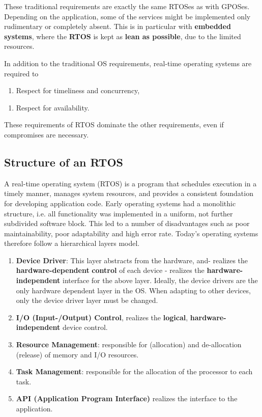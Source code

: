 These traditional requirements are exactly the same RTOSes as with GPOSes. Depending on the application, some of the services might be implemented only  rudimentary or completely absent. This is in particular with \textbf{embedded} \textbf{systems}, where the \textbf{RTOS} is kept as \textbf{lean as possible}, due to the limited resources.

In addition to the traditional OS requirements, real-time operating systems are required to 

\begin{enumerate}
	\item  Respect for timeliness and concurrency,
\end{enumerate}

\begin{enumerate}
	\item  Respect for availability.
\end{enumerate}

These requirements of RTOS dominate the other requirements, even if compromises are necessary.

\subsection{  Structure of an RTOS}

A real-time operating system (RTOS) is a program that schedules execution in a timely manner, manages system resources, and provides a consistent foundation for developing application code. Early operating systems had a monolithic structure, i.e. all functionality was implemented in a uniform, not further subdivided software block. This led to a number of disadvantages such as poor maintainability, poor adaptability and high error rate. Today's operating systems therefore follow a hierarchical layers model. 

\begin{enumerate}
	\item  \textbf{Device Driver}: This layer abstracts from the hardware, and- realizes the \textbf{hardware-dependent} \textbf{control} of each device - realizes the \textbf{hardware-independent} interface for the above layer. Ideally, the device drivers are the only hardware dependent layer in the OS. When adapting to other devices, only the device driver layer must be changed.
	\item  \textbf{I/O (Input-/Output) Control}, realizes the \textbf{logical}, \textbf{hardware-independent} device control. 
	\item  \textbf{Resource Management}: responsible for (allocation) and de-allocation (release) of memory and I/O resources.
	\item  \textbf{Task Management}: responsible for the allocation of the processor to each task. 
	\item  \textbf{API (Application Program Interface)} realizes the interface to the application.
\end{enumerate}

